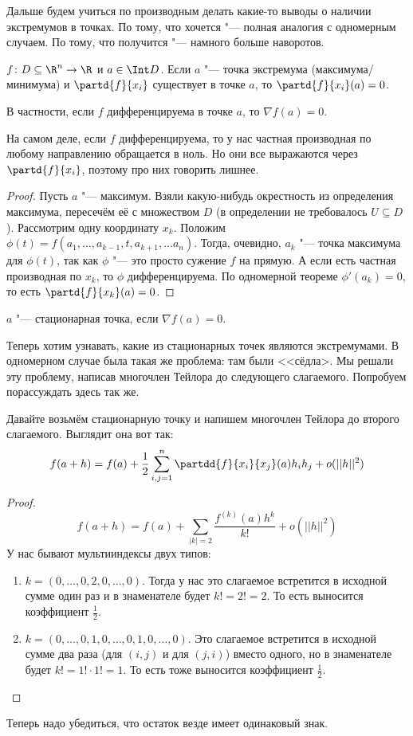 Дальше будем учиться по производным делать какие-то выводы о наличии экстремумов в точках.
По тому, что хочется "--- полная аналогия с одномерным случаем.
По тому, что получится "--- намного больше наворотов.

\begin{theorem}
	$f \colon D \subseteq \R^n \to \R$ и $a \in \Int D$.
	Если $a$ "--- точка экстремума (максимума/минимума) и $\partd{f}{x_i}$ существует в точке $a$,
	то $\partd{f}{x_i}(a)=0$.
\end{theorem}
\begin{Rem}
	В частности, если $f$ дифференцируема в точке $a$, то $\nabla f(a) = 0$.
\end{Rem}
\begin{Rem}
	На самом деле, если $f$ дифференцируема, то у нас частная производная по
	любому направлению обращается в ноль.
	Но они все выражаются через $\partd{f}{x_i}$, поэтому про них говорить лишнее.
\end{Rem}
\begin{proof}
	Пусть $a$ "--- максимум.
	Взяли какую-нибудь окрестность из определения максимума, пересечём её с множеством $D$
	(в определении не требовалось $U \subseteq D$).
	Рассмотрим одну координату $x_k$.
	Положим $\phi(t)=f(a_1, \dots, a_{k-1}, t, a_{k+1}, \dots a_n)$.
	Тогда, очевидно, $a_k$ "--- точка максимума для $\phi(t)$,
	так как $\phi$ "--- это просто сужение $f$ на прямую.
	А если есть частная производная по $x_k$, то $\phi$ дифференцируема.
	По одномерной теореме $\phi'(a_k)=0$, то есть $\partd{f}{x_k}(a)=0$.
\end{proof}

\begin{Def}
	$a$ "--- стационарная точка, если $\nabla f(a) = 0$.
\end{Def}

Теперь хотим узнавать, какие из стационарных точек являются экстремумами.
В одномерном случае была такая же проблема: там были <<сёдла>.
Мы решали эту проблему, написав многочлен Тейлора до следующего слагаемого.
Попробуем порассуждать здесь так же.

Давайте возьмём стационарную точку и напишем многочлен Тейлора до второго слагаемого.
Выглядит она вот так:
\[
	f(a+h) = f(a) + \frac12 \sum_{i,j=1}^n \partdd{f}{x_i}{x_j} (a) h_i h_j + o(||h||^2)
\]
\begin{proof}
	\[ f(a+h) = f(a) + \sum_{|k|=2} \frac{f^{(k)}(a)h^k}{k!} + o(||h||^2)\]
	У нас бывают мультииндексы двух типов:
	\begin{enumerate}
	\item
		$k=(0, \dots, 0, 2, 0, \dots, 0)$.
		Тогда у нас это слагаемое встретится в исходной сумме один раз и в знаменателе будет $k!=2!=2$.
		То есть выносится коэффициент $\frac12$.
	\item
		$k=(0, \dots, 0, 1, 0, \dots, 0, 1, 0, \dots, 0)$.
		Это слагаемое встретится в исходной сумме два раза (для $(i, j)$ и для $(j, i)$)
		вместо одного, но в знаменателе будет $k!=1!\cdot1!=1$.
		То есть тоже выносится коэффициент $\frac12$.
	\end{enumerate}
\end{proof}
Теперь надо убедиться, что остаток везде имеет одинаковый знак.

